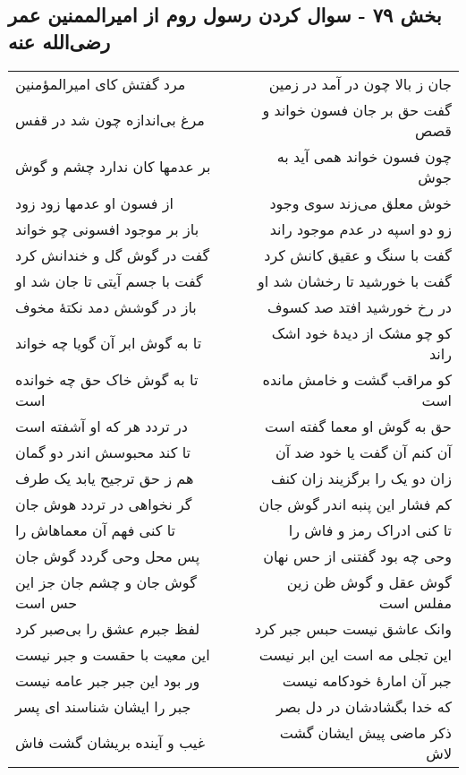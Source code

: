 \begin{center}
\section*{بخش ۷۹ - سوال کردن رسول روم از امیرالممنین عمر رضی‌الله عنه}
\label{sec:sh079}
\begin{longtable}{l p{0.5cm} r}
مرد گفتش کای امیرالمؤمنین
&&
جان ز بالا چون در آمد در زمین
\\
مرغ بی‌اندازه چون شد در قفس
&&
گفت حق بر جان فسون خواند و قصص
\\
بر عدمها کان ندارد چشم و گوش
&&
چون فسون خواند همی آید به جوش
\\
از فسون او عدمها زود زود
&&
خوش معلق می‌زند سوی وجود
\\
باز بر موجود افسونی چو خواند
&&
زو دو اسپه در عدم موجود راند
\\
گفت در گوش گل و خندانش کرد
&&
گفت با سنگ و عقیق کانش کرد
\\
گفت با جسم آیتی تا جان شد او
&&
گفت با خورشید تا رخشان شد او
\\
باز در گوشش دمد نکتهٔ مخوف
&&
در رخ خورشید افتد صد کسوف
\\
تا به گوش ابر آن گویا چه خواند
&&
کو چو مشک از دیدهٔ خود اشک راند
\\
تا به گوش خاک حق چه خوانده است
&&
کو مراقب گشت و خامش مانده است
\\
در تردد هر که او آشفته است
&&
حق به گوش او معما گفته است
\\
تا کند محبوسش اندر دو گمان
&&
آن کنم آن گفت یا خود ضد آن
\\
هم ز حق ترجیح یابد یک طرف
&&
زان دو یک را برگزیند زان کنف
\\
گر نخواهی در تردد هوش جان
&&
کم فشار این پنبه اندر گوش جان
\\
تا کنی فهم آن معماهاش را
&&
تا کنی ادراک رمز و فاش را
\\
پس محل وحی گردد گوش جان
&&
وحی چه بود گفتنی از حس نهان
\\
گوش جان و چشم جان جز این حس است
&&
گوش عقل و گوش ظن زین مفلس است
\\
لفظ جبرم عشق را بی‌صبر کرد
&&
وانک عاشق نیست حبس جبر کرد
\\
این معیت با حقست و جبر نیست
&&
این تجلی مه است این ابر نیست
\\
ور بود این جبر جبر عامه نیست
&&
جبر آن امارهٔ خودکامه نیست
\\
جبر را ایشان شناسند ای پسر
&&
که خدا بگشادشان در دل بصر
\\
غیب و آینده بریشان گشت فاش
&&
ذکر ماضی پیش ایشان گشت لاش

\end{longtable}
\end{center}

